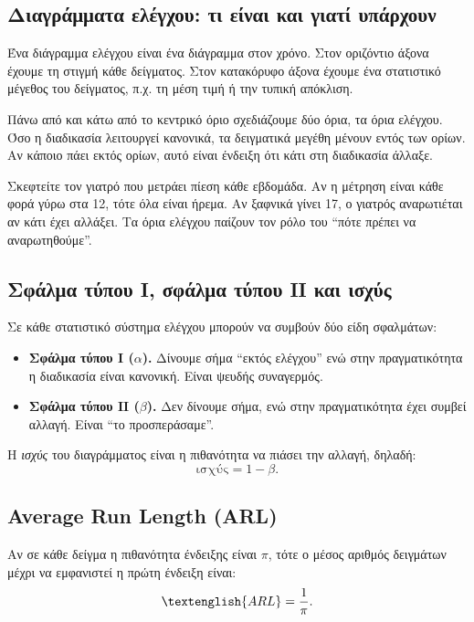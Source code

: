 \documentclass[12pt,a4paper]{article}
\newcommand{\ARL}{\textenglish{ARL}}
\begin{document}
\subsection{Διαγράμματα ελέγχου: τι είναι και γιατί υπάρχουν}

Ένα διάγραμμα ελέγχου είναι ένα διάγραμμα στον χρόνο. Στον οριζόντιο άξονα
έχουμε τη στιγμή κάθε δείγματος. Στον κατακόρυφο άξονα έχουμε ένα στατιστικό
μέγεθος του δείγματος, π.χ. τη μέση τιμή ή την τυπική απόκλιση.

Πάνω από και κάτω από το κεντρικό όριο σχεδιάζουμε δύο όρια, τα όρια ελέγχου.
Όσο η διαδικασία λειτουργεί κανονικά, τα δειγματικά μεγέθη μένουν εντός των
ορίων. Αν κάποιο πάει εκτός ορίων, αυτό είναι ένδειξη ότι κάτι στη διαδικασία
άλλαξε.

\begin{intuition}
Σκεφτείτε τον γιατρό που μετράει πίεση κάθε εβδομάδα. Αν η μέτρηση είναι κάθε
φορά γύρω στα 12, τότε όλα είναι ήρεμα. Αν ξαφνικά γίνει 17, ο γιατρός
αναρωτιέται αν κάτι έχει αλλάξει. Τα όρια ελέγχου παίζουν τον ρόλο του ``πότε
πρέπει να αναρωτηθούμε''.
\end{intuition}

\subsection{Σφάλμα τύπου Ι, σφάλμα τύπου ΙΙ και ισχύς}

Σε κάθε στατιστικό σύστημα ελέγχου μπορούν να συμβούν δύο είδη σφαλμάτων:

\begin{itemize}[leftmargin=2.2em]
    \item \textbf{Σφάλμα τύπου Ι (\(\alpha\)).} Δίνουμε σήμα ``εκτός ελέγχου''
    ενώ στην πραγματικότητα η διαδικασία είναι κανονική. Είναι ψευδής συναγερμός.
    \item \textbf{Σφάλμα τύπου ΙΙ (\(\beta\)).} Δεν δίνουμε σήμα, ενώ στην
    πραγματικότητα έχει συμβεί αλλαγή. Είναι ``το προσπεράσαμε''.
\end{itemize}

Η \emph{ισχύς} του διαγράμματος είναι η πιθανότητα να πιάσει την αλλαγή,
δηλαδή:
\[
    \text{ισχύς}=1-\beta.
\]

\subsection{Average Run Length (ARL)}

Αν σε κάθε δείγμα η πιθανότητα ένδειξης είναι \(\pi\), τότε ο μέσος αριθμός
δειγμάτων μέχρι να εμφανιστεί η πρώτη ένδειξη είναι:
\[
    \ARL=\frac{1}{\pi}.
\]
\end{document}
